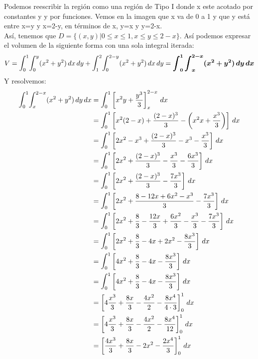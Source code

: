 \documentclass[12pt]{exam}
\begin{document}
\begin{questions}
    
       Podemos reescribir la región como una región de Tipo I donde x este acotado por constantes y y por funciones. Vemos en la imagen que x va de 0 a 1 y que y está entre x=y y x=2-y, en términos de x, y=x y y=2-x.\\
       Así, tenemos que $D=\{ (x,y)| 0\leq x \leq1 , x\leq y \leq 2-x\}$. Así podemos expresar el volumen de la siguiente forma con una sola integral iterada:\\
\[
    V=\mathlarger{\int}_0^1\mathlarger{\int}_0^{y}(x^2+y^2)\,dx\,dy + \mathlarger{\int}_1^2\mathlarger{\int}_0^{2-y}(x^2+y^2)\,dx\,dy = \boldsymbol{ \int_0^1\int_{x}^{2-x}(x^2+y^2)\,dy\,dx}
    \]
    Y resolvemos:
    \begin{align*}
      \mathlarger{\int}_0^1\mathlarger{\int}_{x}^{2-x}(x^2+y^2)\,dy\,dx & =  \mathlarger{\int}_0^1 \left[x^2 y + \frac{y^3}{3}\right]_x^{2-x}\,dx \\
      &=  \mathlarger{\int}_0^1 \left[x^2 (2-x) + \frac{(2-x)^3}{3} - \left( x^2 x + \frac{x^3}{3}\right)  \right] \,dx \\
      &=  \mathlarger{\int}_0^1 \left[2x^2-x^3+ \frac{(2-x)^3}{3} - x^3- \frac{x^3}{3} \right] \,dx \\
      &=  \mathlarger{\int}_0^1 \left[2x^2+ \frac{(2-x)^3}{3}-\frac{x^3}{3} - \frac{6x^3}{3} \right] \,dx \\
      &=  \mathlarger{\int}_0^1 \left[2x^2+ \frac{(2-x)^3}{3}-\frac{7x^3}{3} \right] \,dx \\
      &=  \mathlarger{\int}_0^1 \left[2x^2+ \frac{8-12x+6x^2-x^3}{3}-\frac{7x^3}{3} \right] \,dx \\
      &=  \mathlarger{\int}_0^1 \left[2x^2+ \frac{8}{3}-\frac{12x}{3}+\frac{6x^2}{3}-\frac{x^3}{3}-\frac{7x^3}{3} \right] \,dx \\
      &=  \mathlarger{\int}_0^1 \left[2x^2+ \frac{8}{3}-4x+2x^2-\frac{8x^3}{3} \right] \,dx \\
      &=  \mathlarger{\int}_0^1 \left[4x^2+ \frac{8}{3}-4x-\frac{8x^3}{3} \right] \,dx \\
       &=  \mathlarger{\int}_0^1 \left[4x^2+ \frac{8}{3}-4x-\frac{8x^3}{3} \right] \,dx \\
      &=   \left[4 \frac{x^3}{3}+ \frac{8x}{3}-\frac{4x^2}{2}-\frac{8x^4}{4\cdot 3} \right]_0^1 \,dx \\
      &=   \left[4 \frac{x^3}{3}+ \frac{8x}{3}-\frac{4x^2}{2}-\frac{8x^4}{12} \right]_0^1 \,dx \\
      &=   \left[ \frac{4x^3}{3}+ \frac{8x}{3}-2x^2-\frac{2x^4}{3} \right]_0^1 \,dx \\

\end{align*}
\end{questions}
\end{document}
